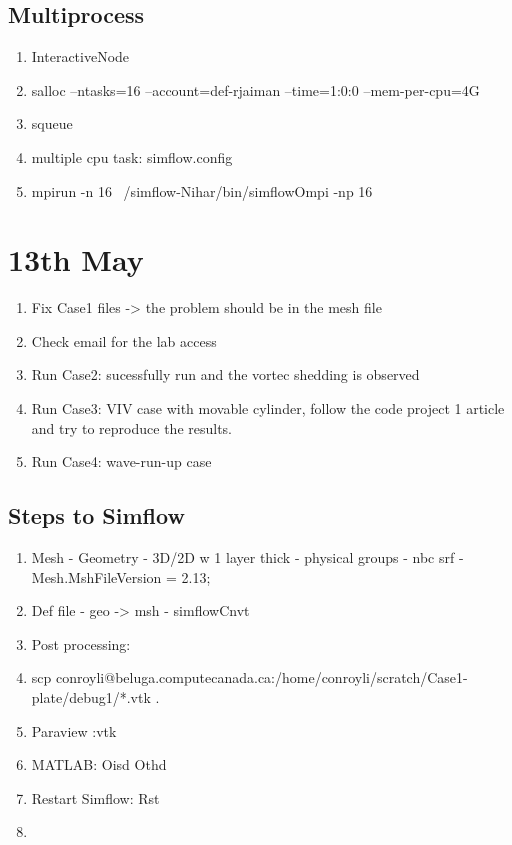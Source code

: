 \documentclass[12pt]{article} %
\begin{document}
\subsection{Multiprocess}
    \begin{enumerate}
        \item InteractiveNode
        \item salloc --ntasks=16 --account=def-rjaiman --time=1:0:0 --mem-per-cpu=4G
        \item squeue
        \item multiple cpu task: simflow.config
        \item mpirun -n 16 ~/simflow-Nihar/bin/simflowOmpi -np 16
    \end{enumerate}

\section{13th May}
\begin{enumerate}
    \item Fix Case1 files -> the problem should be in the mesh file
    \item Check email for the lab access
    \item Run Case2: sucessfully run and the vortec shedding is observed
    \item Run Case3: VIV case with movable cylinder, follow the code project 1 article and try to reproduce the results.
    \item Run Case4: wave-run-up case
\end{enumerate}
\subsection{Steps to Simflow}
\begin{enumerate}
    \item Mesh - Geometry - 3D/2D w 1 layer thick - physical groups - nbc srf - Mesh.MshFileVersion = 2.13;
    \item Def file - geo -> msh - simflowCnvt 
    \item Post processing: \item scp conroyli@beluga.computecanada.ca:/home/conroyli/scratch/Case1-plate/debug1/*.vtk .
    \item Paraview :vtk
    \item MATLAB: Oisd Othd
    \item Restart Simflow: Rst
    \item 
\end{enumerate}
\end{document}
